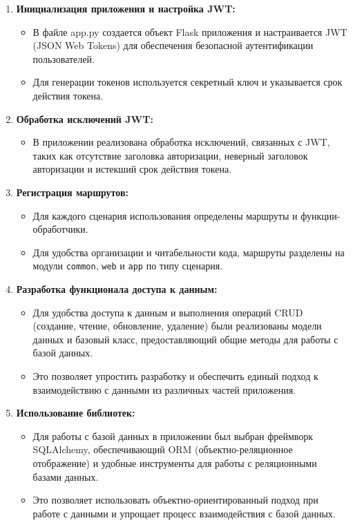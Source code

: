 \documentclass[12pt, russian]{extarticle}
\begin{document}
\begin{spacing}{1.5}
    \begin{enumerate}
        \item \textbf{Инициализация приложения и настройка JWT:}
            \begin{itemize}
                \item В файле app.py создается объект Flask приложения и настраивается JWT (JSON Web Tokens)
                    для обеспечения безопасной аутентификации пользователей.
                \item Для генерации токенов используется секретный ключ и указывается срок действия токена.
            \end{itemize}
        \item \textbf{Обработка исключений JWT:}
            \begin{itemize}
                \item В приложении реализована обработка исключений, связанных с JWT,
                    таких как отсутствие заголовка авторизации, неверный заголовок
                    авторизации и истекший срок действия токена.
            \end{itemize}
        \item \textbf{Регистрация маршрутов:}
        \begin{itemize}
                \item Для каждого сценария использования определены маршруты и функции-обработчики.
                \item Для удобства организации и читабельности кода, маршруты разделены на модули
                    \verb|common|, \verb|web| и \verb|app| по типу сценария.
            \end{itemize}
        \item \textbf{Разработка функционала доступа к данным:}
            \begin{itemize}
                \item Для удобства доступа к данным и выполнения операций CRUD (создание, чтение, обновление, удаление)
                    были реализованы модели данных и базовый класс, предоставляющий общие методы для работы с базой данных.
                \item Это позволяет упростить разработку и обеспечить единый подход к взаимодействию
                    с данными из различных частей приложения.
            \end{itemize}
        \item \textbf{Использование библиотек:}
            \begin{itemize}
                \item Для работы с базой данных в приложении был выбран фреймворк SQLAlchemy,
                    обеспечивающий ORM (объектно-реляционное отображение) и удобные инструменты для работы
                    с реляционными базами данных.
                \item Это позволяет использовать объектно-ориентированный подход при работе с данными
                    и упрощает процесс взаимодействия с базой данных.
            \end{itemize}
    \end{enumerate}


\end{spacing}
\end{document}
